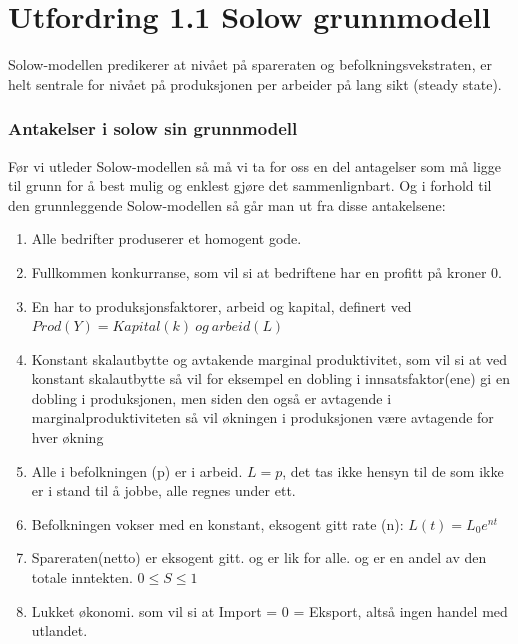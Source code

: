 \documentclass[
  12pt,
  a4paper,
  DIV=11,
  numbers=noendperiod]{scrartcl}
\renewcommand*\contentsname{Table of contents}
\newcommand\contentsname{Table of contents}
\begin{document}

\newpage
\hypersetup{linkcolor=black}
\renewcommand{\contentsname}{Innholdsfortegnelse}
\renewcommand*{\figureautorefname}{Figur}
\renewcommand*{\tableautorefname}{Tabell}
\tableofcontents
\listoffigures
\newpage

\section{Utfordring 1.1 Solow
grunnmodell}\label{utfordring-1.1-solow-grunnmodell}

Solow-modellen predikerer at nivået på spareraten og
befolkningsvekstraten, er helt sentrale for nivået på produksjonen per
arbeider på lang sikt (steady state).

\subsubsection{Antakelser i solow sin
grunnmodell}\label{antakelser-i-solow-sin-grunnmodell}

Før vi utleder Solow-modellen så må vi ta for oss en del antagelser som
må ligge til grunn for å best mulig og enklest gjøre det sammenlignbart.
Og i forhold til den grunnleggende Solow-modellen så går man ut fra
disse antakelsene:

\begin{enumerate}
\def\labelenumi{\arabic{enumi}.}
\item
  Alle bedrifter produserer et homogent gode.
\item
  Fullkommen konkurranse, som vil si at bedriftene har en profitt på
  kroner 0.
\item
  En har to produksjonsfaktorer, arbeid og kapital, definert ved
  \(Prod(Y)=Kapital(k) \> og \> arbeid(L)\)
\item
  Konstant skalautbytte og avtakende marginal produktivitet, som vil si
  at ved konstant skalautbytte så vil for eksempel en dobling i
  innsatsfaktor(ene) gi en dobling i produksjonen, men siden den også er
  avtagende i marginalproduktiviteten så vil økningen i produksjonen
  være avtagende for hver økning
\item
  Alle i befolkningen (p) er i arbeid. \(L=p\), det tas ikke hensyn til
  de som ikke er i stand til å jobbe, alle regnes under ett.
\item
  Befolkningen vokser med en konstant, eksogent gitt rate (n):
  \(L(t)=L_0 e^{nt}\)
\item
  Spareraten(netto) er eksogent gitt. og er lik for alle. og er en andel
  av den totale inntekten. \(0\leq S\leq 1\)
\item
  Lukket økonomi. som vil si at Import = 0 = Eksport, altså ingen handel
  med utlandet.
\end{enumerate}
\end{document}
